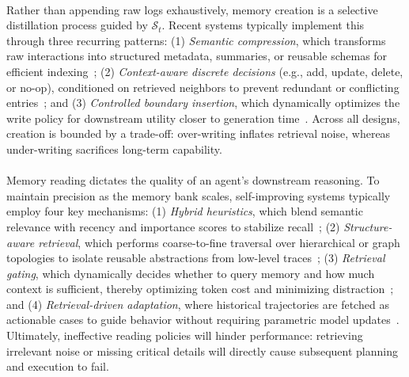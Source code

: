 \documentclass{article}
\newcommand{\tagbox}[2][teal!70!black]{
  \tcbox[
    on line,
    enhanced,
    arc=2.5pt,         
    boxrule=0pt,      
    colback=#1,         
    colframe=#1,        
    coltext=white,     
    boxsep=0.2ex,      
    left=0.5ex,right=0.5ex, top=0.1ex,bottom=0.1ex,
    tcbox raise base   
  ]{\sffamily\bfseries #2}
}
\begin{document}
\paragraph{\tagbox{C}} Rather than appending raw logs exhaustively, memory creation is a selective distillation process guided by $\mathcal{S}_t$. Recent systems typically implement this through three recurring patterns: (1) \emph{Semantic compression}, which transforms raw interactions into structured metadata, summaries, or reusable schemas for efficient indexing~\citep{salama2025meminsightautonomousmemoryaugmentation, wang2024agentworkflowmemory, ouyang2025reasoningbankscalingagentselfevolving}; (2) \emph{Context-aware discrete decisions} (e.g., add, update, delete, or no-op), conditioned on retrieved neighbors to prevent redundant or conflicting entries~\citep{chhikara2025mem0buildingproductionreadyai, xu2025amemagenticmemoryllm}; and (3) \emph{Controlled boundary insertion}, which dynamically optimizes the write policy for downstream utility closer to generation time~\citep{zhang2025memgenweavinggenerativelatent}. Across all designs, creation is bounded by a trade-off: over-writing inflates retrieval noise, whereas under-writing sacrifices long-term capability.



\paragraph{\tagbox[cyan!60!teal]{R}}  Memory reading dictates the quality of an agent's downstream reasoning. To maintain precision as the memory bank scales, self-improving systems typically employ four key mechanisms: (1) \emph{Hybrid heuristics}, which blend semantic relevance with recency and importance scores to stabilize recall~\citep{park2023generativeagentsinteractivesimulacra}; (2) \emph{Structure-aware retrieval}, which performs coarse-to-fine traversal over hierarchical or graph topologies to isolate reusable abstractions from low-level traces~\citep{zhang2025gmemorytracinghierarchicalmemory}; (3) \emph{Retrieval gating}, which dynamically decides whether to query memory and how much context is sufficient, thereby optimizing token cost and minimizing distraction~\citep{wang2025scmenhancinglargelanguage}; and (4) \emph{Retrieval-driven adaptation}, where historical trajectories are fetched as actionable cases to guide behavior without requiring parametric model updates~\citep{zhou2025mementofinetuningllmagents}. Ultimately, ineffective reading policies will hinder performance: retrieving irrelevant noise or missing critical details will directly cause subsequent planning and execution to fail.
\end{document}
